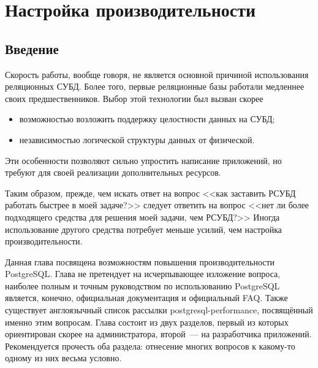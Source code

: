 \chapter{Настройка производительности}
\section{Введение}
Скорость работы, вообще говоря, не является основной причиной использования реляционных СУБД. 
Более того, первые реляционные базы работали медленнее своих предшественников. 
Выбор этой технологии был вызван скорее
\begin{itemize}
\item возможностью возложить поддержку целостности данных на СУБД;
\item независимостью логической структуры данных от физической.
\end{itemize}

Эти особенности позволяют сильно упростить написание приложений, но требуют для 
своей реализации дополнительных ресурсов.

Таким образом, прежде, чем искать ответ на вопрос <<как заставить РСУБД работать быстрее в моей задаче?>> 
следует ответить на вопрос <<нет ли более подходящего средства для решения моей задачи, чем РСУБД?>> 
Иногда использование другого средства потребует меньше усилий, чем настройка производительности.

Данная глава посвящена возможностям повышения производительности PostgreSQL. 
Глава не претендует на исчерпывающее изложение вопроса, наиболее полным и точным руководством по 
использованию PostgreSQL является, конечно, официальная документация и официальный FAQ. 
Также существует англоязычный список рассылки postgresql-performance, посвящённый именно этим вопросам.
Глава состоит из двух разделов, первый из которых ориентирован скорее на администратора, 
второй~--- на разработчика приложений. Рекомендуется прочесть оба раздела: отнесение многих вопросов к 
какому-то одному из них весьма условно.

